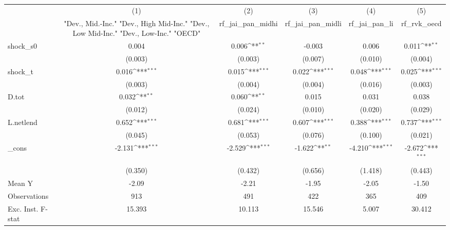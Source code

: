 {
\def\sym#1{\ifmmode^{#1}\else\(^{#1}\)\fi}
\begin{tabular}{l*{5}{c}}
\toprule
            &\multicolumn{1}{c}{(1)}&\multicolumn{1}{c}{(2)}&\multicolumn{1}{c}{(3)}&\multicolumn{1}{c}{(4)}&\multicolumn{1}{c}{(5)}\\
            &\multicolumn{1}{c}{ "Dev., Mid.-Inc." "Dev., High Mid-Inc." "Dev., Low Mid-Inc." "Dev., Low-Inc." "OECD" }&\multicolumn{1}{c}{rf\_jai\_pan\_midhi}&\multicolumn{1}{c}{rf\_jai\_pan\_midli}&\multicolumn{1}{c}{rf\_jai\_pan\_li}&\multicolumn{1}{c}{rf\_rvk\_oecd}\\
\midrule
shock\_s0    &       0.004         &       0.006\sym{**} &      -0.003         &       0.006         &       0.011\sym{**} \\
            &     (0.003)         &     (0.003)         &     (0.007)         &     (0.010)         &     (0.004)         \\
\addlinespace
shock\_t     &       0.016\sym{***}&       0.015\sym{***}&       0.022\sym{***}&       0.048\sym{***}&       0.025\sym{***}\\
            &     (0.003)         &     (0.004)         &     (0.004)         &     (0.016)         &     (0.003)         \\
\addlinespace
D.tot       &       0.032\sym{**} &       0.060\sym{**} &       0.015         &       0.031         &       0.038         \\
            &     (0.012)         &     (0.024)         &     (0.010)         &     (0.020)         &     (0.029)         \\
\addlinespace
L.netlend   &       0.652\sym{***}&       0.681\sym{***}&       0.607\sym{***}&       0.388\sym{***}&       0.737\sym{***}\\
            &     (0.045)         &     (0.053)         &     (0.076)         &     (0.100)         &     (0.021)         \\
\addlinespace
\_cons      &      -2.131\sym{***}&      -2.529\sym{***}&      -1.622\sym{**} &      -4.210\sym{***}&      -2.672\sym{***}\\
            &     (0.350)         &     (0.432)         &     (0.656)         &     (1.418)         &     (0.443)         \\
\midrule
Mean Y      &       -2.09         &       -2.21         &       -1.95         &       -2.05         &       -1.50         \\
Observations&         913         &         491         &         422         &         365         &         409         \\
Exc. Inst. F-stat&      15.393         &      10.113         &      15.546         &       5.007         &      30.412         \\
\bottomrule
\end{tabular}
}
